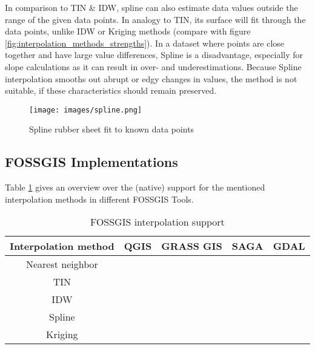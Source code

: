 In comparison to TIN \& IDW, spline can also estimate data values outside the range of the given data points. In analogy to TIN, its surface will fit through the data points, unlike IDW or Kriging methods (compare with figure \ref{fig:interpolation_methods_strengths}). In a dataset where points are close together and have large value differences, Spline is a disadvantage, especially for slope calculations as it can result in over- and underestimations. \cite{wasser_going_2020} Because Spline interpolation smooths out abrupt or \ldq{}edgy\rdq{} changes in values, the method is not suitable, if these characteristics should remain preserved.

\begin{figure}
	\centering
	\texttt{[image: images/spline.png]}
	\caption{Spline \ldq{}rubber sheet\rdq{} fit to known data points \cite{albrecht_spline_2005}}
	\label{fig:spline}
\end{figure}


\subsection{FOSSGIS Implementations}

Table \ref{tab:fossgis_support} gives an overview over the (native) support for the mentioned interpolation methods in different FOSSGIS Tools.

\begin{table}[H]
	\centering
	\begin{tabular}{c|c|c|c|c}
		Interpolation method & QGIS & GRASS GIS & SAGA & GDAL\\
		\hline
		Nearest neighbor & \xmark &\cmark &\cmark & \cmark \\
		\hline
		TIN & \cmark &\cmark &\cmark & \cmark \\
		\hline
		IDW & \cmark &\cmark &\cmark & \cmark \\
		\hline
		Spline & \xmark &\cmark &\cmark & \xmark \\
		\hline
		Kriging & \xmark &\cmark &\cmark & \xmark \\
	\end{tabular}
	\caption{FOSSGIS interpolation support}
	\label{tab:fossgis_support}
\end{table}








